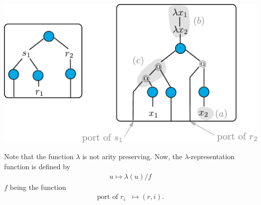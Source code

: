 \begin{center}
\includegraphics[scale=.33]{pictures/lambda}
\end{center}
Note that the function $\lambda$ is not arity preserving. Now, the $\lambda$-representation function is defined by
\begin{align*}
u \mapsto \lambda(u)/f 
\end{align*}
 $f$ being the function
 \begin{align*}
 \text{port of $r_i$ } \mapsto (r,i).
 \end{align*}


